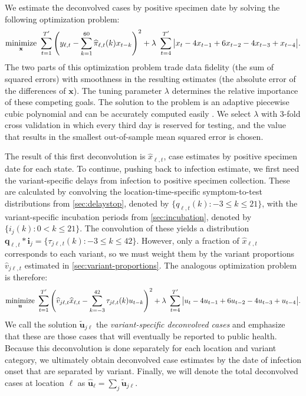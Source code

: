 We estimate the deconvolved cases by positive specimen date by solving the
following optimization problem:
\begin{align}
\operatorname*{minimize}_{\mathbf{x}}\ \sum_{t=1}^{T'} 
\left( y_{\ell,t} -  \sum_{k=1}^{60}\widehat{\pi}_{\ell,t}(k) x_{t-k} \right)^2 
+ \lambda\ \sum_{t=4}^{T'} \big|x_t - 4x_{t-1} + 6x_{t-2} -4x_{t-3}+ x_{t-4}\big|.
\end{align}
The two parts of this optimization problem trade data fidelity (the sum of
squared errors) with smoothness in the resulting estimates (the absolute error
of the differences of $\mathbf{x}$). The tuning parameter $\lambda$ determines
the relative importance of these competing goals. The solution to the problem is
an adaptive piecewise cubic polynomial \citep{tibshirani2014adaptive,
tibshirani2022divided} and can be accurately computed easily
\citep{ramdas2016fast}. We select $\lambda$ with $3$-fold cross validation
\citep{jahja2022real} in which every third day is reserved for testing, and the
value that results in the smallest out-of-sample mean squared error is chosen.

The result of this first deconvolution is $\widehat{x}_{\ell,t}$, case estimates
by positive specimen date for each state. To continue, pushing back to infection
estimate, we first need the variant-specific delays from infection to positive
specimen collection. These are calculated by convolving the
location-time-specific symptom-to-test distributions from
\autoref{sec:delaystop}, denoted by $\{q_{\ell,t}(k) : -3\leq k \leq 21\}$, with
the variant-specific incubation periods from \autoref{sec:incubation}, denoted
by $\{i_{j}(k) : 0 < k \leq 21\}$. The convolution of these yields a
distribution $\mathbf{q}_{\ell,t}*\mathbf{i}_j = \{\tau_{j\ell,t}(k): -3 \leq k
\leq 42\}$. However, only a fraction of $\widehat{x}_{\ell,t}$ corresponds to
each variant, so we must weight them by the variant proportions
$\widehat{v}_{j\ell,t}$ estimated in \autoref{sec:variant-proportions}. The
analogous optimization problem is therefore:
\begin{align}
\operatorname*{minimize}_{\mathbf{u}}\ \sum_{t=1}^{T'} 
\left( 
    \widehat{v}_{j\ell,t}\widehat{x}_{\ell,t} -  
    \sum_{k=-3}^{42} \tau_{j\ell,t}(k) u_{t-k} 
\right)^2 
+ \lambda\ \sum_{t=4}^{T'} \big|u_{t} - 4u_{t-1} + 6u_{t-2} -4u_{t-3}+ u_{t-4}\big|.
\end{align}
We call the solution $\widetilde{\mathbf{u}}_{j\ell}$ the \emph{variant-specific
deconvolved cases} and emphasize that these are those cases that will eventually
be reported to public health. Because this deconvolution is done separately for
each location and variant category, we ultimately obtain deconvolved case
estimates by the date of infection onset that are separated by variant. Finally,
we will denote the total deconvolved cases at location $\ell$ as
$\widehat{\mathbf{u}}_\ell = \sum_j \widetilde{\mathbf{u}}_{j\ell}$. 

